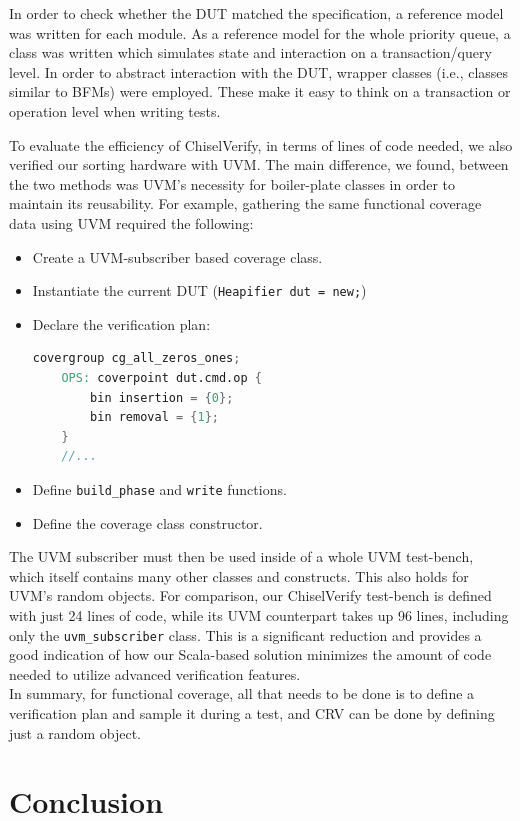 \documentclass[conference]{IEEEtran}
\begin{document}
In order to check whether the DUT matched the specification, a reference model was written for each module. 
As a reference model for the whole priority queue, a class was written which simulates state and interaction on a transaction/query level. In order to abstract interaction with the DUT, wrapper classes (i.e., classes similar to BFMs) were employed. 
These make it easy to think on a transaction or operation level when writing tests.

To evaluate the efficiency of ChiselVerify, in terms of lines of code needed, we also verified our sorting hardware with UVM.
The main difference, we found, between the two methods was UVM's necessity for boiler-plate classes in order to maintain its reusability.
For example, gathering the same functional coverage data using UVM required the following: 
\begin{itemize}
    \item Create a UVM-subscriber based coverage class.
    \item Instantiate the current DUT (\texttt{Heapifier dut = new;})
    \item Declare the verification plan: 
    \begin{lstlisting}[language=verilog]
	covergroup cg_all_zeros_ones;
	OPS: coverpoint dut.cmd.op {
		bin insertion = {0};
		bin removal = {1};
	}
	//...
    \end{lstlisting}
    \item Define \texttt{build\_phase} and \texttt{write} functions.
    \item Define the coverage class constructor.
\end{itemize}  
The UVM subscriber must then be used inside of a whole UVM test-bench, which itself contains many other classes and constructs.
This also holds for UVM's random objects.
For comparison, our ChiselVerify test-bench is defined with just 24 lines of code,
while its UVM counterpart takes up 96 lines, including only the \texttt{uvm\_subscriber} class.
This is a significant reduction and provides a good indication of how our Scala-based solution minimizes the amount of code needed to utilize advanced verification features. \\
In summary, for functional coverage, all that needs to be done is to define a verification plan and sample it during a test, and
CRV can be done by defining just a random object. 

\section{Conclusion}
\end{document}
